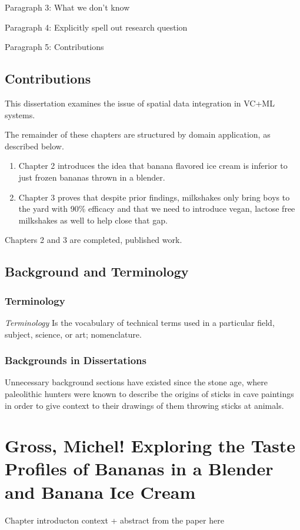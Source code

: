 \documentclass[oneside,openany]{report}
\let\Oldsection\section
\renewcommand{\section}{\FloatBarrier\Oldsection}
\let\Oldsubsection\subsection
\renewcommand{\subsection}{\FloatBarrier\Oldsubsection}
\begin{document}
Paragraph 3: What we don't know

Paragraph 4: Explicitly spell out research question

Paragraph 5: Contributions


\section{Contributions}
This dissertation examines the issue of spatial data integration in VC+ML systems. 

\noindent The remainder of these chapters are structured by domain application, as described below. 

\begin{enumerate}
    \item Chapter 2 introduces the idea that banana flavored ice cream is inferior to just frozen bananas thrown in a blender.
    \item Chapter 3 proves that despite prior findings, milkshakes only bring boys to the yard with 90\% efficacy and that we need to introduce vegan, lactose free milkshakes as well to help close that gap.
\end{enumerate}

Chapters 2 and 3 are completed, published work.

\section{Background and Terminology}

\subsection{Terminology}
\textit{Terminology} Is the vocabulary of technical terms used in a particular field, subject, science, or art; nomenclature.

\subsection{Backgrounds in Dissertations}
Unnecessary background sections have existed since the stone age, where paleolithic hunters were known to describe the origins of sticks in cave paintings in order to give context to their drawings of them throwing sticks at animals.

\chapter{Gross, Michel! Exploring the Taste Profiles of Bananas in a Blender and Banana Ice Cream}
Chapter introducton context + abstract from the paper here
\end{document}
